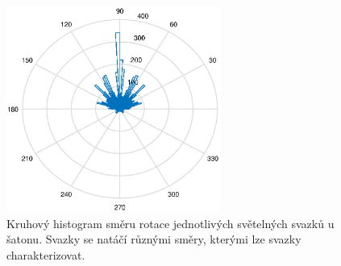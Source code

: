 \begin{figure}[h!]
\begin{center}
\includegraphics[width = 7cm]{figures/saton_smer.eps}
\end{center}
\caption{Kruhový histogram směru rotace jednotlivých světelných svazků u šatonu. Svazky se natáčí různými směry, kterými lze svazky charakterizovat.}

\label{fig:kruhovy histogram saton}
\end{figure}

  
